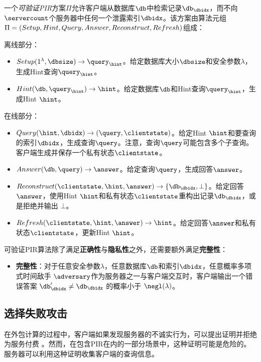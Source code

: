 \begin{definition}[可验证PIR]
    一个\textit{可验证PIR}方案$\Pi$允许客户端从数据库$\db$中检索记录$\db_\dbidx$，而不向$\servercount$个服务器中任何一个泄露索引$\dbidx$。该方案由算法元组$\Pi = (Setup, Hint, Query,\\ Answer, Reconstruct, Refresh)$组成：

    离线部分：
    \begin{itemize}[leftmargin=*]
        \item $Setup(1^\lambda,\dbsize) \rightarrow \query_\hint$。给定数据库大小$\dbsize$和安全参数$\lambda$，生成Hint查询$\query_\hint$。
        \item $Hint(\db, \query_\hint) \rightarrow \hint$。给定数据库$\db$和Hint查询$\query_\hint$，生成Hint $\hint$。
    \end{itemize}
    在线部分：
    \begin{itemize}[leftmargin=*]
        \item $Query(\hint, \dbidx) \rightarrow (\query, \clientstate)$。给定Hint $\hint$和要查询的索引$\dbidx$，生成查询$\query$。注意，查询$\query$可能包含多个子查询。客户端生成并保存一个私有状态$\clientstate$。
        \item $Answer(\db, \query) \rightarrow \answer$。给定查询$\query$，生成回答$\answer$。
        \item $Reconstruct(\clientstate, \hint, \answer) \rightarrow \{\db_\dbidx, \bot\}$。给定回答$\answer$，使用Hint $\hint$和私有状态$\clientstate$重构出记录$\db_\dbidx$，或是拒绝并输出 $\bot$。
        \item $Refresh(\clientstate, \hint, \answer) \rightarrow \hint$。给定回答$\answer$和私有状态$\clientstate$，更新Hint $\hint$。
    \end{itemize}
    可验证PIR算法除了满足\textbf{正确性}与\textbf{隐私性}之外，还需要额外满足\textbf{完整性}：
    \begin{itemize}
        \item \textbf{完整性}：对于任意安全参数$\lambda$，任意数据库$\db$和索引$\dbidx$，任意概率多项式时间敌手 $\adversary$作为服务器之一与客户端交互时，客户端输出一个错误答案 $\db_\dbidx' \neq \db_\dbidx$ 的概率小于 $\negl(\lambda)$。
    \end{itemize}
\end{definition}

\subsection{选择失败攻击}
在外包计算的过程中，客户端如果发现服务器的不诚实行为，可以提出证明并拒绝为服务付费 \cite{chen2012efficient, carbunar2011payments}。然而，在包含PIR在内的一部分场景中，这种证明可能是危险的。服务器可以利用这种证明收集客户端的查询信息。

